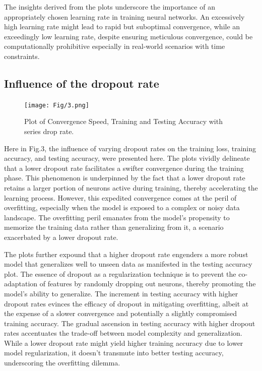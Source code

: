 \documentclass[10pt,twocolumn,letterpaper]{article}
\begin{document}
The insights derived from the plots underscore the importance of an appropriately chosen learning rate in training neural networks. An excessively high learning rate might lead to rapid but suboptimal convergence, while an exceedingly low learning rate, despite ensuring meticulous convergence, could be computationally prohibitive especially in real-world scenarios with time constraints.

\subsection{Influence of the dropout rate}

\begin{figure}[htbp]
   \centering
   \texttt{[image: Fig/3.png]}
   \caption{Plot of Convergence Speed, Training and Testing Accuracy with series drop rate.} \label{fig3}
\end{figure}

Here in Fig.3, the influence of varying dropout rates on the training loss, training accuracy, and testing accuracy, were presented here. The plots vividly delineate that a lower dropout rate facilitates a swifter convergence during the training phase. This phenomenon is underpinned by the fact that a lower dropout rate retains a larger portion of neurons active during training, thereby accelerating the learning process. However, this expedited convergence comes at the peril of overfitting, especially when the model is exposed to a complex or noisy data landscape. The overfitting peril emanates from the model's propensity to memorize the training data rather than generalizing from it, a scenario exacerbated by a lower dropout rate.

The plots further expound that a higher dropout rate engenders a more robust model that generalizes well to unseen data as manifested in the testing accuracy plot. The essence of dropout as a regularization technique is to prevent the co-adaptation of features by randomly dropping out neurons, thereby promoting the model's ability to generalize. The increment in testing accuracy with higher dropout rates evinces the efficacy of dropout in mitigating overfitting, albeit at the expense of a slower convergence and potentially a slightly compromised training accuracy. The gradual ascension in testing accuracy with higher dropout rates accentuates the trade-off between model complexity and generalization. While a lower dropout rate might yield higher training accuracy due to lower model regularization, it doesn’t transmute into better testing accuracy, underscoring the overfitting dilemma.
\end{document}
